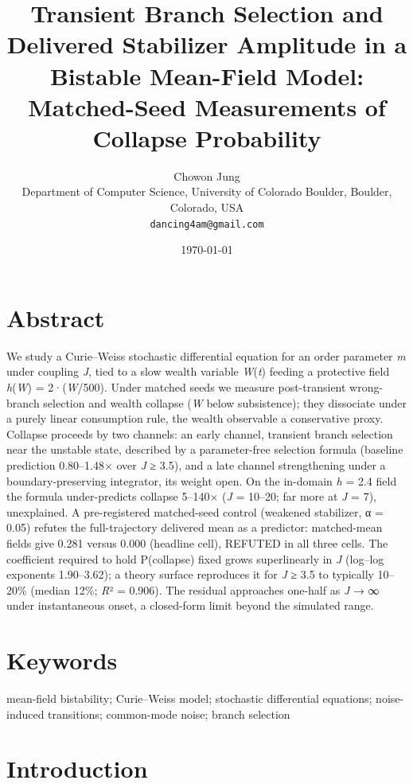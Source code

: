 \documentclass[11pt,letterpaper]{article}
\title{Transient Branch Selection and Delivered Stabilizer Amplitude in a Bistable Mean-Field Model:\\
Matched-Seed Measurements of Collapse Probability}
\author{Chowon Jung\\
Department of Computer Science, University of Colorado Boulder, Boulder, Colorado, USA\\
\small\texttt{dancing4am@gmail.com}}
\date{\today}
\begin{document}
\linenumbers
\maketitle

\section{Abstract}\label{abstract}

We study a Curie--Weiss stochastic differential equation for an order parameter \emph{m} under coupling \emph{J}, tied to a slow wealth variable \emph{W}(\emph{t}) feeding a protective field \emph{h}(\emph{W}) = 2·(\emph{W}/500). Under matched seeds we measure post-transient wrong-branch selection and wealth collapse (\emph{W} below subsistence); they dissociate under a purely linear consumption rule, the wealth observable a conservative proxy. Collapse proceeds by two channels: an early channel, transient branch selection near the unstable state, described by a parameter-free selection formula (baseline prediction 0.80--1.48× over \emph{J} ≥ 3.5), and a late channel strengthening under a boundary-preserving integrator, its weight open. On the in-domain \emph{h} = 2.4 field the formula under-predicts collapse 5--140× (\emph{J} = 10--20; far more at \emph{J} = 7), unexplained. A pre-registered matched-seed control (weakened stabilizer, α = 0.05) refutes the full-trajectory delivered mean as a predictor: matched-mean fields give 0.281 versus 0.000 (headline cell), REFUTED in all three cells. The coefficient required to hold P(collapse) fixed grows superlinearly in \emph{J} (log--log exponents 1.90--3.62); a theory surface reproduces it for \emph{J} ≥ 3.5 to typically 10--20\% (median 12\%; \emph{R}² = 0.906). The residual approaches one-half as \emph{J} → ∞ under instantaneous onset, a closed-form limit beyond the simulated range.

\section{Keywords}\label{keywords}

mean-field bistability; Curie--Weiss model; stochastic differential equations; noise-induced transitions; common-mode noise; branch selection

\section{Introduction}\label{introduction}
\end{document}
